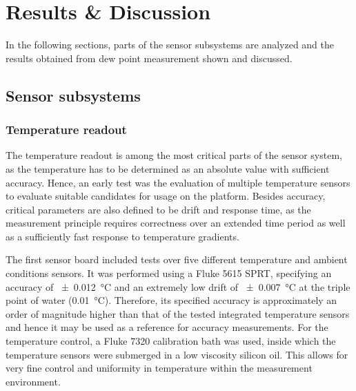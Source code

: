 \chapter{Results \& Discussion}\label{c:results}
In the following sections, parts of the sensor subsystems are analyzed and the results obtained from dew point measurement shown and discussed. 

\section{Sensor subsystems}


\subsection{Temperature readout}

The temperature readout is among the most critical parts of the sensor system, as the temperature has to be determined as an absolute value with sufficient accuracy. Hence, an early test was the evaluation of multiple temperature sensors to evaluate suitable candidates for usage on the platform. Besides accuracy, critical parameters are also defined to be drift and response time, as the measurement principle requires correctness over an extended time period as well as a sufficiently fast response to temperature gradients.



The first sensor board included tests over five different temperature and ambient conditions sensors. It was performed using a Fluke 5615 \gls{SPRT}, specifying an accuracy of \qty{\pm 0.012}{\celsius} and an extremely low drift of \qty{\pm 0.007}{\celsius} at the triple point of water (\qty{0.01}{\celsius}). Therefore, its specified accuracy is approximately an order of magnitude higher than that of the tested integrated temperature sensors and hence it may be used as a reference for accuracy measurements. For the temperature control, a Fluke 7320 calibration bath was used, inside which the temperature sensors were submerged in a low viscosity silicon oil. This allows for very fine control and uniformity in temperature within the measurement environment. 

